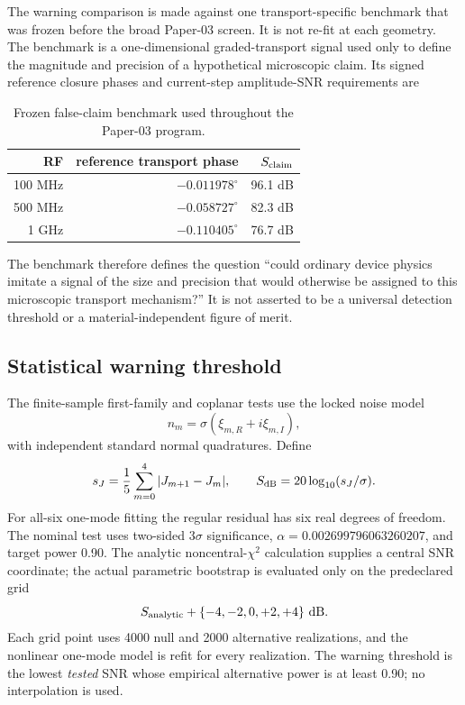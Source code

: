 \documentclass[11pt]{article}
\begin{document}
The warning comparison is made against one transport-specific benchmark that was frozen before the broad Paper-03 screen. It is not re-fit at each geometry. The benchmark is a one-dimensional graded-transport signal used only to define the magnitude and precision of a hypothetical microscopic claim. Its signed reference closure phases and current-step amplitude-SNR requirements are
\begin{table}[H]
\centering
\caption{Frozen false-claim benchmark used throughout the Paper-03 program.}
\label{tab:benchmark}
\begin{tabular}{rrr}
\toprule
RF & reference transport phase & $S_{\rm claim}$\\
\midrule
100 MHz & $-0.011978^\circ$ & 96.1 dB\\
500 MHz & $-0.058727^\circ$ & 82.3 dB\\
1 GHz & $-0.110405^\circ$ & 76.7 dB\\
\bottomrule
\end{tabular}
\end{table}
The benchmark therefore defines the question ``could ordinary device physics imitate a signal of the size and precision that would otherwise be assigned to this microscopic transport mechanism?'' It is not asserted to be a universal detection threshold or a material-independent figure of merit.

\subsection{Statistical warning threshold}

The finite-sample first-family and coplanar tests use the locked noise model
\begin{equation}
n_m=\sigma(\xi_{m,R}+i\xi_{m,I}),
\end{equation}
with independent standard normal quadratures. Define
\begin{equation}
s_J=\frac{1}{5}\sum_{m=0}^{4}|J_{m+1}-J_m|,
\qquad
S_{\rm dB}=20\log_{10}(s_J/\sigma).
\label{eq:snr}
\end{equation}
For all-six one-mode fitting the regular residual has six real degrees of freedom. The nominal test uses two-sided $3\sigma$ significance, $\alpha=0.002699796063260207$, and target power 0.90. The analytic noncentral-$\chi^2$ calculation supplies a central SNR coordinate; the actual parametric bootstrap is evaluated only on the predeclared grid
\begin{equation}
S_{\rm analytic}+\{-4,-2,0,+2,+4\}\ \mathrm{dB}.
\end{equation}
Each grid point uses 4000 null and 2000 alternative realizations, and the nonlinear one-mode model is refit for every realization. The warning threshold is the lowest \emph{tested} SNR whose empirical alternative power is at least 0.90; no interpolation is used.
\end{document}
